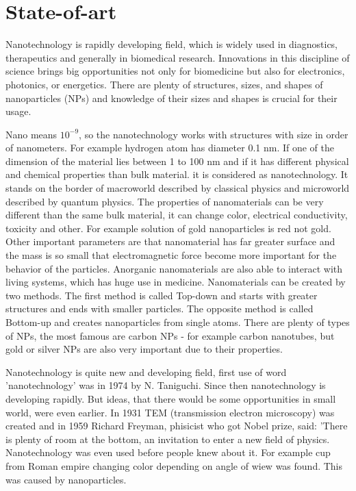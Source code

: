     \section{State-of-art}

    \pagestyle{plain}

        Nanotechnology is rapidly developing field, which is widely used in diagnostics, therapeutics and generally in biomedical research.
        Innovations in this discipline of science brings big opportunities not only for biomedicine but also for electronics, photonics, or energetics.
        There are plenty of structures, sizes, and shapes of nanoparticles (NPs) and knowledge of their sizes and shapes is crucial for their usage. \cite{35, 36, 37}

        Nano means $10^{-9}$, so the nanotechnology works with structures with size in order of nanometers. For example hydrogen atom has diameter 0.1 nm.
        If one of the dimension of the material lies between 1 to 100 nm and if it has different physical and chemical properties than bulk material.
        it is considered as nanotechnology. It stands on the border of macroworld described by classical physics and microworld described by quantum physics.
        The properties of nanomaterials can be very different than the same bulk material, it can change color, electrical conductivity, toxicity and other.
        For example solution of gold nanoparticles is red not gold. Other important parameters are that nanomaterial has far greater surface and the mass is
        so small that electromagnetic force become more important for the behavior of the particles. Anorganic nanomaterials are also able to interact
        with living systems, which has huge use in medicine. Nanomaterials can be created by two methods. The first method is called Top-down and
        starts with greater structures and ends with smaller particles. The opposite method is called Bottom-up and creates nanoparticles from single atoms.
        There are plenty of types of NPs, the most famous are carbon NPs - for example carbon nanotubes, but gold or silver NPs are also very important
        due to their properties. \cite{9, 10, 11, 12, 13, 14, 33, 34}

        Nanotechnology is quite new and developing field, first use of word 'nanotechnology' was in 1974 by N. Taniguchi. Since then nanotechnology is developing rapidly.
        But ideas, that there would be some opportunities in small world, were even earlier. In 1931 TEM (transmission electron microscopy) was created and
        in 1959 Richard Freyman, phisicist who got Nobel prize, said: 'There is plenty of room at the bottom, an invitation to enter a new field of physics.
        Nanotechnology was even used before people knew about it. For example cup from Roman empire changing color depending on angle of wiew was found.
        This was caused by nanoparticles. \cite{11, 12, 33, 34}

